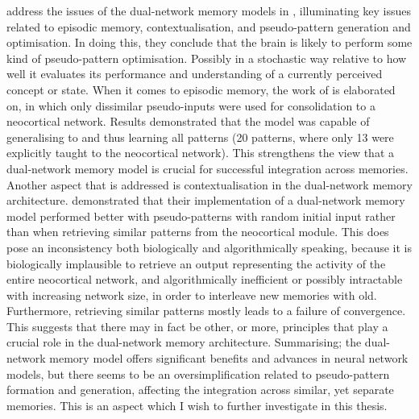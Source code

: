 \cite{French2001} address the issues of the dual-network memory models in \citep{French1997, Ans1997}, illuminating key issues related to episodic memory, contextualisation, and pseudo-pattern generation and optimisation. In doing this, they conclude that the brain is likely to perform some kind of pseudo-pattern optimisation. Possibly in a stochastic way relative to how well it evaluates its performance and understanding of a currently perceived concept or state. When it comes to episodic memory, the work of \cite{Ans2000} is elaborated on, in which only dissimilar pseudo-inputs were used for consolidation to a neocortical network. Results demonstrated that the model was capable of generalising to and thus learning all patterns (20 patterns, where only 13 were explicitly taught to the neocortical network). This strengthens the view that a dual-network memory model is crucial for successful integration across memories. Another aspect that is addressed is contextualisation in the dual-network memory architecture. \cite{Ans2000} demonstrated that their implementation of a dual-network memory model performed better with pseudo-patterns with random initial input rather than when retrieving similar patterns from the neocortical module. This does pose an inconsistency both biologically and algorithmically speaking, because it is biologically implausible to retrieve an output representing the activity of the entire neocortical network, and algorithmically inefficient or possibly intractable with increasing network size, in order to interleave new memories with old. Furthermore, retrieving similar patterns mostly leads to a failure of convergence. This suggests that there may in fact be other, or more, principles that play a crucial role in the dual-network memory architecture. Summarising; the dual-network memory model offers significant benefits and advances in neural network models, but there seems to be an oversimplification related to pseudo-pattern formation and generation, affecting the integration across similar, yet separate memories. This is an aspect which I wish to further investigate in this thesis.

